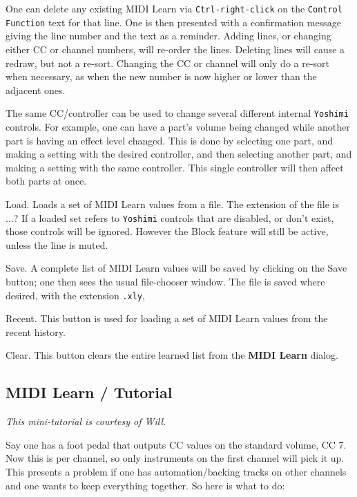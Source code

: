    One can delete any existing MIDI Learn via
   \texttt{Ctrl-right-click}
   on the
   \texttt{Control Function} text for that line.
   One is then presented with a confirmation message giving the line number and
   the text as a reminder.
   Adding lines, or changing either CC or channel numbers, will
   re-order the lines.
   Deleting lines will cause a redraw, but not a re-sort.
   Changing the CC or channel will only do a re-sort when necessary, as when the
   new number is now higher or lower than the adjacent ones.

   The same CC/controller can be used to change several different internal
   \texttt{Yoshimi} controls.  For example, one can have a part's volume being
   changed while another part is having an effect level changed.
   This is done by selecting one part, and making a setting with the desired
   controller, and then selecting another part, and making a setting with the
   same controller.  
   This single controller will then affect both parts at once.

   Load.
   Loads a set of MIDI Learn values from a file.
   The extension of the file is ...?
   If a loaded set refers to \texttt{Yoshimi}
   controls that are disabled, or don't exist, those controls will be ignored.
   However the Block feature will still be active, unless the line is muted.

   Save.
   A complete list of MIDI Learn values
   will be saved by clicking on the Save button; one then sees
   the usual file-chooser window.
   The file is saved where desired, with the extension \texttt{.xly},

   Recent.
   This button is used for loading a set of
   MIDI Learn values from the recent history.

   Clear.
   This button clears the entire learned list from the
   \textbf{MIDI Learn} dialog.


\subsection{MIDI Learn / Tutorial}
\label{subsec:midi_learn_tutorial}

   \textsl{This mini-tutorial is courtesy of Will.}

   Say one has a foot pedal that outputs CC values on the standard volume, CC 7.
   Now this is per channel, so only instruments on the first channel will pick
   it up.  This presents a problem if one has automation/backing tracks on
   other channels and one wants to keep everything together. So here is what to
   do:

